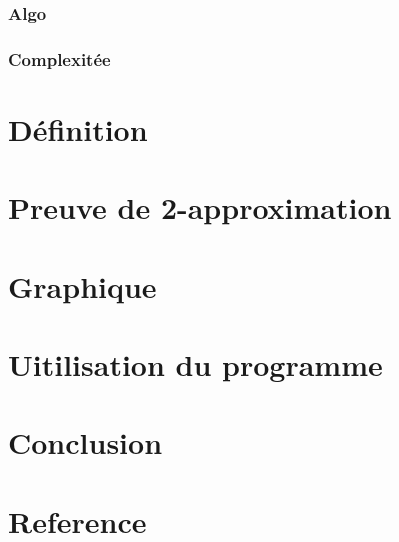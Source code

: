 \documentclass[a4paper,11pt]{article}
\begin{document}
\subsubsection*{Algo}
\subsubsection*{Complexitée}

\section{Définition} %

\section{Preuve de 2-approximation} %

\section{Graphique} %

\section{Uitilisation du programme} %

\section{Conclusion} %

\section{Reference}
\end{document}
